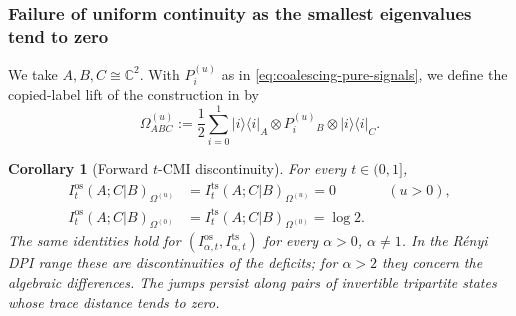 \documentclass[11pt]{article}
\newtheorem{corollary}[corollary]{Corollary}
\theoremstyle{remark}
\DeclareMathOperator{\os}{os}
\DeclareMathOperator{\ts}{ts}
\newcommand{\1}{\mathbbm{1}}
\begin{document}
\subsubsection{Failure of uniform continuity as the smallest
eigenvalues tend to zero}

We take $A,B,C\cong\mathbb C^2$.  With $P_i^{(u)}$ as in
\eqref{eq:coalescing-pure-signals}, we define the copied-label lift of
the construction in
\cite[proof of Proposition~6.7]{bluhm2023continuity} by
\begin{equation}
 \Omega_{ABC}^{(u)}
 :=\frac12\sum_{i=0}^1
 |i\rangle\langle i|_A\otimes P_i^{(u)}{}_B
 \otimes|i\rangle\langle i|_C.
 \label{eq:copied-label-tripartite-state}
\end{equation}

\begin{corollary}[Forward $t$-CMI discontinuity]
\label{cor:one-sided-t-CMI-discontinuity}
For every $t\in(0,1]$,
\begin{equation}
 \begin{aligned}
 I_t^{\os}(A;C|B)_{\Omega^{(u)}}
 &=I_t^{\ts}(A;C|B)_{\Omega^{(u)}}=0 &&(u>0),\\
 I_t^{\os}(A;C|B)_{\Omega^{(0)}}
 &=I_t^{\ts}(A;C|B)_{\Omega^{(0)}}=\log2.
 \end{aligned}
 \label{eq:one-sided-t-CMI-jump}
\end{equation}
The same identities hold for
$(I_{\alpha,t}^{\os},I_{\alpha,t}^{\ts})$ for every
$\alpha>0$, $\alpha\neq1$.  In the R\'enyi DPI range these are
discontinuities of the deficits; for $\alpha>2$ they concern the
algebraic differences.  The jumps persist along pairs of invertible tripartite states whose trace distance tends to zero.
\end{corollary}
\end{document}
